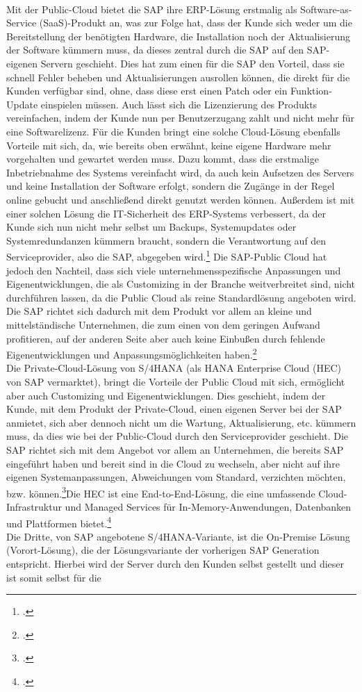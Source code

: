 \\Mit der Public-Cloud bietet die SAP ihre ERP-Lösung erstmalig als Software-as-Service (SaaS)-Produkt an, was zur Folge hat, dass der Kunde sich weder um die Bereitstellung der benötigten Hardware, die Installation noch der Aktualisierung der Software kümmern muss, da dieses zentral durch die SAP auf den SAP-eigenen Servern geschieht. Dies hat zum einen für die SAP den Vorteil, dass sie schnell Fehler beheben und Aktualisierungen ausrollen können, die direkt für die Kunden verfügbar sind, ohne, dass diese erst einen Patch oder ein Funktion-Update einspielen müssen. Auch lässt sich die Lizenzierung des Produkts vereinfachen, indem der Kunde nun per Benutzerzugang zahlt und nicht mehr für eine Softwarelizenz. Für die Kunden bringt eine solche Cloud-Lösung ebenfalls Vorteile mit sich, da, wie bereits oben erwähnt, keine eigene Hardware mehr vorgehalten und gewartet werden muss. Dazu kommt, dass die erstmalige Inbetriebnahme des Systems vereinfacht wird, da auch kein Aufsetzen des Servers und keine Installation der Software erfolgt, sondern die Zugänge in der Regel online gebucht und anschließend direkt genutzt werden können. Außerdem ist mit einer solchen Lösung die IT-Sicherheit des ERP-Systems verbessert, da der Kunde sich nun nicht mehr selbst um Backups, Systemupdates oder Systemredundanzen kümmern braucht, sondern die Verantwortung auf den Serviceprovider, also die SAP, abgegeben wird.\footcite[Vgl.][]{saas} Die SAP-Public Cloud hat jedoch den Nachteil, dass sich viele unternehmensspezifische Anpassungen und Eigenentwicklungen, die als \glqq{}Customizing\grqq{} in der Branche weitverbreitet sind, nicht durchführen lassen, da die Public Cloud als reine Standardlösung angeboten wird. Die SAP richtet sich dadurch mit dem Produkt vor allem an kleine und mittelständische Unternehmen, die zum einen von dem geringen Aufwand profitieren, auf der anderen Seite aber auch keine Einbußen durch fehlende Eigenentwicklungen und Anpassungsmöglichkeiten haben.\footcite[Vgl.][]{rz10-s4hana}\\Die Private-Cloud-Lösung von S/4HANA (als \glqq{}HANA Enterprise Cloud (HEC)\grqq{} von SAP vermarktet), bringt die Vorteile der Public Cloud mit sich, ermöglicht aber auch Customizing und Eigenentwicklungen. Dies geschieht, indem der Kunde, mit dem Produkt der Private-Cloud, einen eigenen Server bei der SAP anmietet, sich aber dennoch nicht um die Wartung, Aktualisierung, etc. kümmern muss, da dies wie bei der Public-Cloud durch den Serviceprovider geschieht. Die SAP richtet sich mit dem Angebot vor allem an Unternehmen, die bereits SAP eingeführt haben und bereit sind in die Cloud zu wechseln, aber nicht auf ihre eigenen Systemanpassungen, Abweichungen vom Standard, verzichten möchten, bzw. können.\footcite[Vgl.][]{rz10-hana}\glqq{}Die HEC ist eine End-to-End-Lösung, die eine umfassende Cloud-Infrastruktur und Managed Services für In-Memory-Anwendungen, Datenbanken und Plattformen bietet.\grqq{}\footcite[][]{rz10-hana}\\Die Dritte, von SAP angebotene S/4HANA-Variante, ist die On-Premise Lösung (Vorort-Lösung), die der Lösungsvariante der vorherigen SAP Generation entspricht. Hierbei wird der Server durch den Kunden selbst gestellt und dieser ist somit selbst für die 